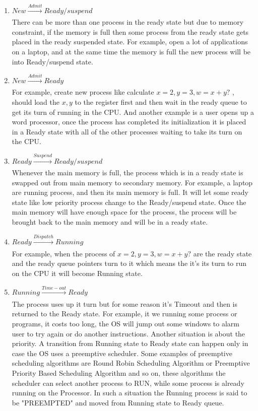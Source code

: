\documentclass[12pt]{article}
\newenvironment{sol}[1][Solution]{\begin{trivlist}\item[\hskip\labelsep {\bfseries #1:}]}{\end{trivlist}}
\begin{document}
\begin{enumerate}
\begin{sol}
\begin{enumerate}
    \item $New \xrightarrow[]{Admit} Ready/suspend$\\
    There can be more than one process in the ready state but due to memory constraint, if the memory is full then some process from the ready state gets placed in the ready suspended state. For example, open a lot of applications on a laptop, and at the same time the memory is full the new process will be into Ready/suspend state.
    \item $New \xrightarrow[]{Admit}  Ready$\\
    For example, create new process like calculate $x=2, y= 3, w = x + y?$ , should load the $x, y$ to the register first and then wait in the ready queue to get its turn of running in the CPU. And another example is a user opens up a word processor, once the process has completed its initialization it is placed in a Ready state with all of the other processes waiting to take its turn on the CPU. 
    \item $Ready \xrightarrow[]{Suspend} Ready/suspend$ \\
    Whenever the main memory is full, the process which is in a ready state is swapped out from main memory to secondary memory. For example, a laptop are running process, and then its main memory is full. It will let some ready state like low priority process change to the Ready/suspend state. Once the main memory will have enough space for the process, the process will be brought back to the main memory and will be in a ready state.
    \item $Ready \xrightarrow[]{Dispatch} Running$\\
    For example, when the process of $x=2, y= 3, w = x + y?$ are the ready state and the ready queue pointers turn to it which means the it's its turn to run on the CPU it will become Running state.
    \item $Running \xrightarrow[]{Time-out} Ready$\\
    The process uses up it turn but for some reason it's Timeout and then is returned to the Ready state. For example, it we running some process or programs, it costs too long, the OS will jump out some windows to alarm user to try again or do another instructions. Another situation is about the priority. A transition from Running state to Ready state can happen only in case the OS uses a preemptive scheduler. Some examples of preemptive scheduling algorithms are Round Robin Scheduling Algorithm or Preemptive Priority Based Scheduling Algorithm and so on, these algorithms the scheduler can select another process to RUN, while some process is already running on the Processor. In such a situation the Running process is said to be "PREEMPTED" and moved from Running state to Ready queue.
    

\end{enumerate}
\end{sol}
\end{enumerate}
\end{document}
